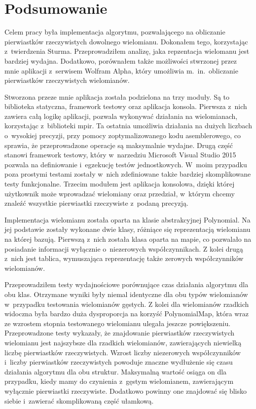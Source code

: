 \chapter{Podsumowanie}

Celem pracy była implementacja algorytmu, pozwalającego na obliczanie pierwiastków rzeczywistych dowolnego wielomianu. Dokonałem tego, korzystając z~twierdzenia Sturma. Przeprowadziłem analizę, jaka repzentacja wielomanu jest bardziej wydajna. Dodatkowo, porównałem także możliwości stwrzonej przez mnie aplikacji z~serwisem Wolfram Alpha, który umożliwia m.\ in.\ obliczanie pierwiastków rzeczywistych wielomianów.

Stworzona przeze mnie aplikacja została podzielona na trzy moduły. Są to biblioteka statyczna, framework testowy oraz aplikacja konsola. Pierwsza z~nich zawiera całą logikę aplikacji, pozwala wykonywać działania na wielomianach, korzystając z~biblioteki mpir. Ta ostatnia umożliwia działania na dużych liczbach o~wysokiej precyzji, przy pomocy zoptymalizowanego kodu asemblerowego, co sprawia, że przeprowadzone operacje są maksymalnie wydajne. Drugą część stanowi framework testowy, który w~narzedziu Microsoft Visual Studio 2015 pozwala na definiowanie i~egzekucję testów jednostkowych. W~moim przypadku poza prostymi testami zostały w~nich zdefiniowane także bardziej skomplikowane testy funkcjonalne. Trzecim modułem jest aplikacja konsolowa, dzięki której użytkownik może wprowadzać wielomiany oraz przedział, w~którym chcemy znaleźć wszystkie pierwiastki rzeczywiste z~podaną precyzją.

Implementacja wielomianu została oparta na klasie abstrakcyjnej Polynomial. Na jej podstawie zostały wykonane dwie klasy, różniące się reprezentacją wielomianu na której bazują. Pierwszą z~nich została klasa oparta na mapie, co pozwalało na posiadanie informacji wyłącznie o~niezerowych współczynnikach. Z kolei drugą z~nich jest tablica, wymuszająca reprezentację także zerowych współczynników wielomianów.

Przeprowadziłem testy wydajnościowe porównujące czas działania algorytmu dla obu klas. Otrzymane wyniki były niemal identyczne dla obu typów wielomianów w~przypadku testowania wielomianów gęstych. Z kolei dla wielomianów rzadkich widoczna była bardzo duża dysproporcja na korzyść PolynomialMap, która wraz ze wzrostem stopnia testowanego wielomianu ulegała jeszcze powiększeniu. Przeprowadzone testy wykazały, że znajdowanie pierwiastków rzeczywistych wielomianu jest najszybsze dla rzadkich wielomianów, zawierających niewielką liczbę pierwiastków rzeczywistych. Wzrost liczby niezerowych współczynników i~liczby pierwiastków rzeczywistych powoduje znaczne wydłużenie się czasu działania algorytmu dla obu struktur. Maksymalną wartość osiąga on dla przypadku, kiedy mamy do czynienia z~gęstym wielomianem, zawierającym wyłącznie pierwiastki rzeczywiste. Dodatkowo powinny one znajdować się blisko siebie i~zawierać skomplikowaną część ułamkową.


